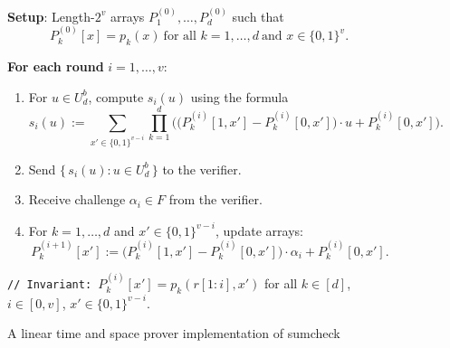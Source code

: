 \begin{figure}[H]
\centering
\caption{A linear time and space prover implementation of sumcheck}
\label{fig:linear-sc}
\vspace{-1em}
\begin{mdframed}[linewidth=1pt,roundcorner=8pt,backgroundcolor=gray!2,innerleftmargin=10pt,innerrightmargin=10pt]

\textbf{Setup}: Length-$2^{v}$ arrays $P^{(0)}_1,\ldots,P^{(0)}_d$ such that
\[
P^{(0)}_k[x] = p_k(x) \ \text{for all } k = 1,\ldots,d \ \text{and } x \in \{0,1\}^{v}.
\]

\textbf{For each round} $i = 1,\ldots,v$:
\begin{enumerate}
  \item For $u \in U_{d}^{b}$, compute $s_i(u)$ using the formula
  \[
  s_i(u) := \sum_{x' \in \{0,1\}^{v-i}} \prod_{k=1}^{d}
  \Big( \big(P^{(i)}_k[1,x'] - P^{(i)}_k[0,x']\big)\cdot u + P^{(i)}_k[0,x'] \Big).
  \]
  \item Send $\{\, s_i(u) : u \in U_{d}^{b} \,\}$ to the verifier.
  \item Receive challenge $\alpha_i \in F$ from the verifier.
  \item For $k = 1,\ldots,d$ and $x' \in \{0,1\}^{v-i}$, update arrays:
  \[
  P^{(i+1)}_k[x'] := \big(P^{(i)}_k[1,x'] - P^{(i)}_k[0,x']\big)\cdot \alpha_i + P^{(i)}_k[0,x'].
  \]
\end{enumerate}

\texttt{// Invariant: }$P^{(i)}_k[x'] = p_k(r[1:i], x')$ for all $k \in [d]$, $i \in [0,v]$, $x' \in \{0,1\}^{v-i}$.

\end{mdframed}
\end{figure}